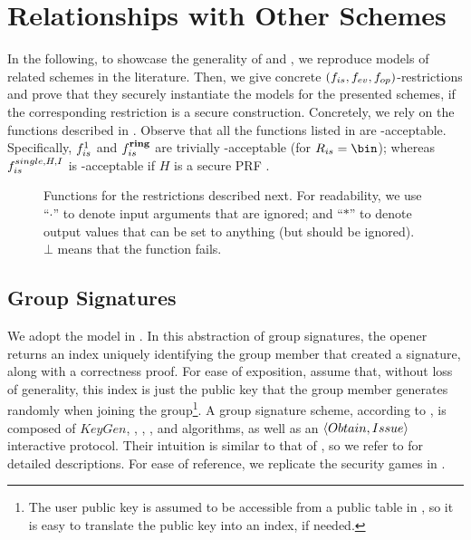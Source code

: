 \section{Relationships with Other Schemes}
\label{sec:relationships}


In the following, to showcase the generality of \UAS and \CUASGen, we reproduce
models of related schemes in the literature.
Then, we give concrete $(f_{is},f_{ev},f_{op})$-\CUASGen restrictions and prove
that they securely instantiate the models for the presented schemes, if the
corresponding \CUASGen restriction is a secure \UAS construction. Concretely,
we rely on the functions described in . Observe
that all the \fissue functions listed in  are
\UAS-acceptable. Specifically, $f_{is}^1$ and $f_{is}^{\mathbf{ring}}$ are trivially
\UAS-acceptable (for $\rngfissue = \bin$); whereas $f_{is}^{single,H,I}$ is
\UAS-acceptable if $H$ is a secure PRF \cite{kl14}.

\begin{figure}[ht!]
  \centering
  \scalebox{0.85}{
    
  }
  \caption{Functions for the \CUASGen restrictions described next.
    For readability, we use ``$\cdot$'' to denote input arguments that are
    ignored; and ``$\ast$'' to denote output values that can be set to anything
    (but should be ignored). $\bot$ means that the function fails.}
  \label{fig:func-restrictions}
\end{figure}

\subsection{Group Signatures}
\label{ssec:related-models-gs}

We adopt the model in \cite{bsz05}. In this abstraction of group signatures, the
opener returns an index uniquely identifying the group member that created a
signature, along with a correctness proof. For ease of exposition, assume that,
without loss of generality, this index is just the public key that the group
member generates randomly when joining the group\footnote{The user public key is
  assumed to be
  accessible from a public table in \cite{bsz05}, so it is easy to translate the
  public key into an index, if needed.}. A group signature scheme, according to
\cite{bsz05}, is composed of $KeyGen$, \UKeyGen, \Sign, \Verify, \Open and
\Judge algorithms, as well as an $\langle Obtain,Issue\rangle$ interactive
protocol. Their intuition is similar to that of \UAS, so we refer to
\cite{bsz05} for detailed descriptions. For ease of reference, we replicate the
security games in .

